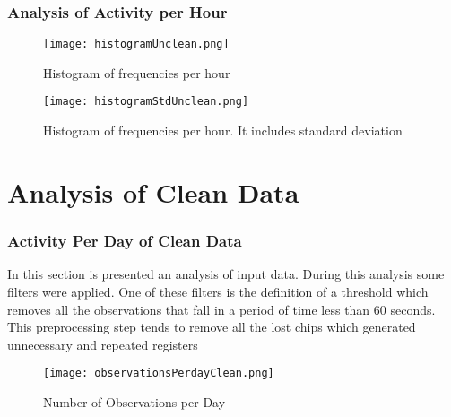 \documentclass[11pt,fleqn]{book} %
\begin{document}
%
\subsection{Analysis of Activity per Hour}%
\label{subsec:Analysis of Activity per Hour}%


\begin{figure}[h!]%
\centering%
\texttt{[image: histogramUnclean.png]}%
\caption{Histogram of frequencies per hour}%
\end{figure}

%


\begin{figure}[h!]%
\centering%
\texttt{[image: histogramStdUnclean.png]}%
\caption{Histogram of frequencies per hour. It includes standard deviation}%
\end{figure}

\chapter{Analysis of Clean Data}
\normalsize%
\subsection{Activity Per Day of Clean Data}%
\label{subsec:Activity Per Day of Clean Data}%
In this section is presented an analysis of input data. During this analysis some filters were applied. One of these filters is the definition of a threshold which removes all the observations that fall in a period of time less than 60 seconds. This preprocessing step tends to  remove all the lost chips which generated unnecessary and repeated registers %


\begin{figure}[h!]%
\centering%
\texttt{[image: observationsPerdayClean.png]}%
\caption{Number of Observations per Day}%
\end{figure}
\end{document}
